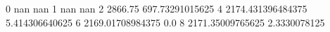 0 nan nan
1 nan nan
2 2866.75 697.73291015625
4 2174.431396484375 5.414306640625
6 2169.01708984375 0.0
8 2171.35009765625 2.3330078125
